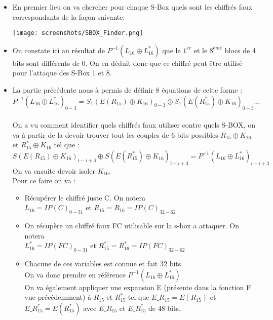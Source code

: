 \documentclass[a4paper,11pt]{article}
\begin{document}
	\begin{itemize}
		\item En premier lieu on va chercher pour chaque S-Box quels sont les chiffrés faux correspondants de la façon suivante:\\ 
		\begin{center}\texttt{[image: screenshots/SBOX\_Finder.png]}\end{center}
		\item On constate ici au résultat de $P^{-1}(L_{16} \oplus L_{16}^{*})$ que le $1^{er}$ et le $8^{ème}$ blocs de 4 bits sont différents de 0. On en déduit donc que ce chiffré peut être utilisé pour l'attaque des S-Box 1 et 8.
		\item La partie précédente nous à permis de définir 8 équations de cette forme :
		$$P^{-1} (L_{16} \oplus L_{16}^{*})_{0-3} = S_{1}(E(R_{15})\oplus K_{16})_{0-3} \oplus S_{1}(E(R_{15}^{*})\oplus K_{16})_{0-3}...$$\\
		On a vu comment identifier quels chiffrés faux utiliser contre quels S-BOX, on va à partir de la devoir trouver tout les couples de 6 bits possibles $R_{15}\oplus K_{16}$ et $R_{15}^{*}\oplus K_{16}$ tel que :
		$$S(E(R_{15})\oplus K_{16})_{i-i+3} \oplus S(E(R_{15}^{*})\oplus K_{16})_{i-i+3} = P^{-1} (L_{16} \oplus L_{16}^{*})_{i-i+3}$$
		On va ensuite devoir isoler $K_{16}$.\\
		Pour ce faire on va :\\
		\begin{itemize}
			\item Récupérer le chiffré juste C. On notera\\ 
			$L_{16} = IP(C)_{0-31}$  et $ R_{15} = R_{16}  = IP(C)_{32-62}$\\
			\item On récupère un chiffré faux FC utilisable sur la s-box a attaquer. On notera \\
			 $L_{16}^{*} = IP(FC)_{0-31}$  et $ R_{15}^{*} = R_{16}^{*} = IP(FC)_{32-62}$\\
			\item Chacune de ces variables est connue et fait 32 bits.\\
			On va donc prendre en référence $P^{-1}(L_{16} \oplus L_{16}^{*})$\\
			On va également appliquer une expansion E (présente dans la fonction F vue précédemment) à $R_{15}$ et $R_{15}^{*}$ tel que $E\_R_{15} = E(R_{15})$ et $E\_R_{15}^{*} = E(R_{15}^{*})$ avec $E\_R_{15}$ et $E\_R_{15}^{*}$ de 48 bits.\\

\end{itemize}
\end{itemize}
\end{document}
